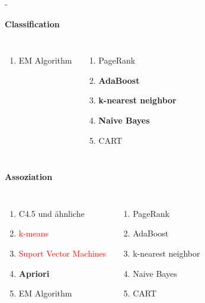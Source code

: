 \documentclass[fleqn,11pt,aspectratio=43]{beamer}
\begin{document}
\begin{frame}{\insertsectionhead - \insertsubsectionhead \cite{wu2008top}}
\begin{block}{\vspace{-0.2em}\textbf{Classification}\vspace{-0.2em}}
\begin{columns}[onlytextwidth]
\begin{enumerate}[label=\bfseries\arabic*.]
		\item EM Algorithm
		\end{enumerate}
	    \begin{enumerate}[label=\bfseries\arabic*.]
	    \setlength{\itemsep}{-5pt}
	    \setcounter{enumi}{5}
	    \item PageRank
	    \item \textbf{AdaBoost}
	    \item \textbf{k-nearest neighbor}
	    \item \textbf{Naive Bayes}
	    \item CART
	    \end{enumerate}
\end{columns}
\vspace{-0.3em}
\end{block}
\pause
\vspace{-0.4em}
\begin{block}{\vspace{-0.2em}\textbf{Assoziation}\vspace{-0.2em}}
\vspace{-1.5em}
\begin{columns}[onlytextwidth]
		\begin{enumerate}[label=\bfseries\arabic*.]
		\setlength{\itemsep}{-5pt}
		\item C4.5 und ähnliche
		\item \textcolor{red}{k-means}
		\item \textcolor{red}{Suport Vector Machines}
		\item \textbf{Apriori}
		\item EM Algorithm
		\end{enumerate}
	    \begin{enumerate}[label=\bfseries\arabic*.]
	    \setlength{\itemsep}{-5pt}
	    \setcounter{enumi}{5}
	    \item PageRank
	    \item AdaBoost
	    \item k-nearest neighbor
	    \item Naive Bayes
	    \item CART
	    \end{enumerate}
\end{columns}
\vspace{-0.3em}
\end{block}
\end{frame}

%
\end{document}
